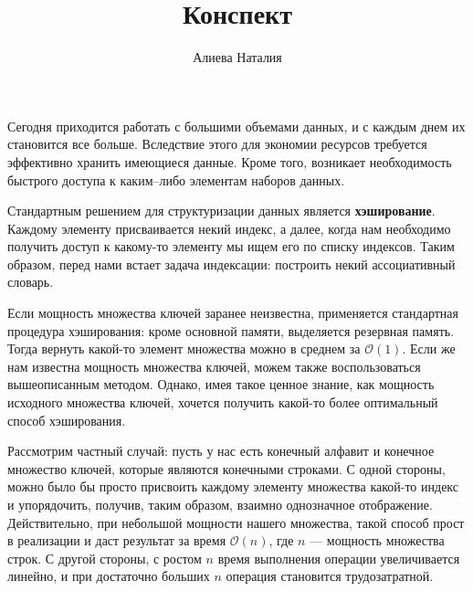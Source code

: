 \documentclass[specialist,
               substylefile = spbu.rtx,
               subf,href,colorlinks=true, 12pt]{disser}
\begin{document}


\title{Конспект}


\author{Алиева Наталия}


\date{\number\year}

\maketitle

\tableofcontents

\intro

Сегодня приходится работать с большими объемами данных, и с каждым днем их становится все больше. Вследствие этого  для экономии ресурсов требуется эффективно хранить имеющиеся данные. Кроме того, возникает необходимость быстрого доступа к каким--либо элементам наборов данных.

Стандартным решением для структуризации данных является \textbf{хэширование}. Каждому элементу присваивается некий индекс, а далее, когда нам необходимо получить доступ к какому-то элементу мы ищем его по списку индексов. Таким образом, перед нами встает задача индексации: построить некий ассоциативный словарь.

Если мощность множества ключей заранее неизвестна, применяется стандартная процедура хэширования: кроме основной памяти, выделяется резервная память. Тогда вернуть какой-то элемент множества можно в среднем за $\mathcal{O}(1)$. Если же нам известна мощность множества ключей, можем также воспользоваться вышеописанным методом. Однако, имея такое ценное знание, как мощность исходного множества ключей, хочется получить какой-то более оптимальный способ хэширования.

Рассмотрим частный случай: пусть у нас есть конечный алфавит и конечное множество ключей, которые являются конечными строками. С одной стороны, можно было бы просто присвоить каждому элементу множества какой-то индекс и упорядочить, получив, таким образом, взаимно однозначное отображение. Действительно, при небольшой мощности нашего множества, такой способ прост в реализации и даст результат за время $\mathcal{O}(n)$, где $n$ --- мощность множества строк. С другой стороны, с ростом $n$ время выполнения операции увеличивается линейно, и при достаточно больших $n$ операция становится трудозатратной.
\end{document}
